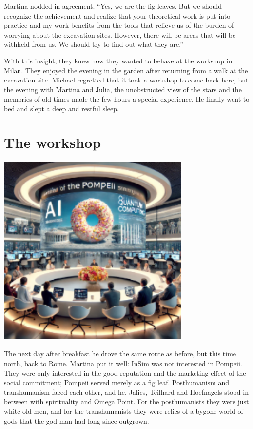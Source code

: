 \documentclass[
]{article}
\begin{document}
Martina nodded in agreement. ``Yes, we are the fig leaves. But we should
recognize the achievement and realize that your theoretical work is put
into practice and my work benefits from the tools that relieve us of the
burden of worrying about the excavation sites. However, there will be
areas that will be withheld from us. We should try to find out what they
are.''

With this insight, they knew how they wanted to behave at the workshop
in Milan. They enjoyed the evening in the garden after returning from a
walk at the excavation site. Michael regretted that it took a workshop
to come back here, but the evening with Martina and Julia, the
unobstructed view of the stars and the memories of old times made the
few hours a special experience. He finally went to bed and slept a deep
and restful sleep.

\section{The workshop}\label{the-workshop}

\includegraphics[width=3.78224in,height=3.82538in]{media/image13.png}

The next day after breakfast he drove the same route as before, but this
time north, back to Rome. Martina put it well: InSim was not interested
in Pompeii. They were only interested in the good reputation and the
marketing effect of the social commitment; Pompeii served merely as a
fig leaf. Posthumanism and transhumanism faced each other, and he,
Jalics, Teilhard and Hoefnagels stood in between with spirituality and
Omega Point. For the posthumanists they were just white old men, and for
the transhumanists they were relics of a bygone world of gods that the
god-man had long since outgrown.
\end{document}
